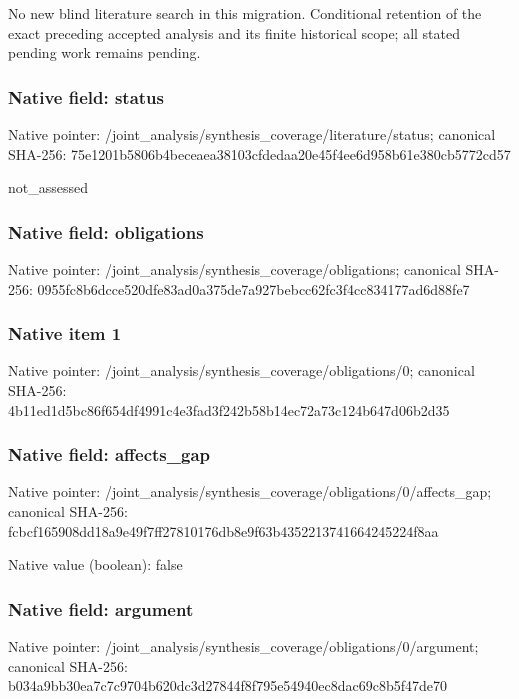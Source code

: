 \documentclass[10pt,a4paper]{article}
\begin{document}
\begingroup\raggedright\sloppy No new blind literature search in this migration. Conditional retention of the exact preceding accepted analysis and its finite historical scope;\allowbreak{} all stated pending work remains pending.\par\endgroup

\subsubsection{Native field: status}
Native pointer: /joint\_\allowbreak{}analysis/synthesis\_\allowbreak{}coverage/literature/status; canonical SHA-256: 75e1201b5806b4beceaea38103cfdedaa20e45f4ee6d958b61e380cb5772cd57

\begingroup\raggedright\sloppy not\_\allowbreak{}assessed\par\endgroup

\subsubsection{Native field: obligations}
Native pointer: /joint\_\allowbreak{}analysis/synthesis\_\allowbreak{}coverage/obligations; canonical SHA-256: 0955fc8b6dcce520dfe83ad0a375de7a927bebcc62fc3f4cc834177ad6d88fe7

\subsubsection{Native item 1}
Native pointer: /joint\_\allowbreak{}analysis/synthesis\_\allowbreak{}coverage/obligations/0; canonical SHA-256: 4b11ed1d5bc86f654df4991c4e3fad3f242b58b14ec72a73c124b647d06b2d35

\subsubsection{Native field: affects\_\allowbreak{}gap}
Native pointer: /joint\_\allowbreak{}analysis/synthesis\_\allowbreak{}coverage/obligations/0/affects\_\allowbreak{}gap; canonical SHA-256: fcbcf165908dd18a9e49f7ff27810176db8e9f63b4352213741664245224f8aa

Native value (boolean): false

\subsubsection{Native field: argument}
Native pointer: /joint\_\allowbreak{}analysis/synthesis\_\allowbreak{}coverage/obligations/0/argument; canonical SHA-256: b034a9bb30ea7c7c9704b620dc3d27844f8f795e54940ec8dac69c8b5f47de70
\end{document}
